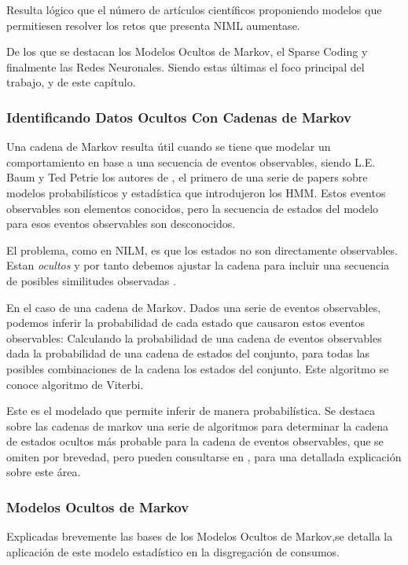 Resulta lógico que el número de artículos científicos proponiendo modelos que permitiesen resolver los retos que presenta NIML aumentase.


De los que se destacan los Modelos Ocultos de Markov, el Sparse Coding y finalmente las Redes Neuronales. Siendo estas últimas el foco principal del trabajo, y de este capítulo. 



\subsubsection{Identificando Datos Ocultos Con Cadenas de Markov}
Una cadena de Markov resulta útil cuando se tiene que modelar un comportamiento en base a una secuencia de eventos observables, siendo L.E. Baum y Ted Petrie los autores de \autocite{introductorHMM}, el primero de una serie de papers sobre modelos probabilísticos y estadística que introdujeron los HMM.
Estos eventos observables son elementos conocidos, pero la secuencia de estados del modelo para esos eventos observables son desconocidos. 

El problema, como en NILM, es que los estados no son directamente observables. Estan \textit{ocultos} y por tanto debemos ajustar la cadena para incluir una secuencia de posibles similitudes observadas \autocite{markovStandford}. 

En el caso de una cadena de Markov. Dados una serie de eventos observables, podemos inferir la probabilidad de cada estado que causaron estos eventos observables: Calculando la probabilidad de una cadena de eventos observables dada la probabilidad de una cadena de estados del conjunto, para todas las posibles combinaciones de la cadena los estados del conjunto. 
Este algoritmo se conoce algoritmo de Viterbi.

Este es el modelado que permite inferir de manera probabilística.
Se destaca sobre las cadenas de markov una serie de algoritmos para determinar la cadena de estados ocultos más probable para la cadena de eventos observables, que se omiten por brevedad, pero pueden consultarse en \autocite{markovStandford}, para una detallada explicación sobre este área.

\subsubsection{Modelos Ocultos de Markov}
Explicadas brevemente las bases de los Modelos Ocultos de Markov,se detalla la aplicación de este modelo estadístico en la disgregación de consumos. 

